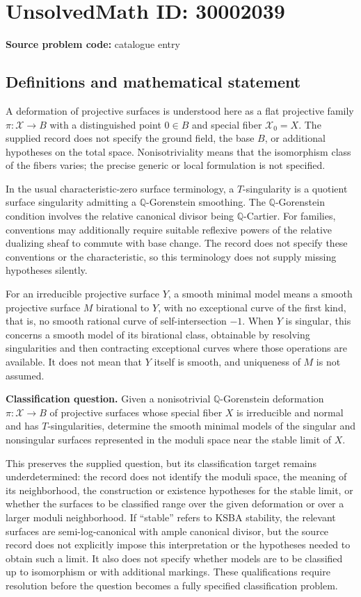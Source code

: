 \documentclass[11pt]{article}
\newcommand{\Q}{\mathbb{Q}}
\begin{document}
\section*{UnsolvedMath ID: 30002039}
\textbf{Source problem code:} catalogue entry
\subsection{Definitions and mathematical statement}
A deformation of projective surfaces is understood here as a flat projective family \(\pi\colon\mathcal X\to B\) with a distinguished point \(0\in B\) and special fiber \(\mathcal X_0=X\). The supplied record does not specify the ground field, the base \(B\), or additional hypotheses on the total space. Nonisotriviality means that the isomorphism class of the fibers varies; the precise generic or local formulation is not specified.

In the usual characteristic-zero surface terminology, a \(T\)-singularity is a quotient surface singularity admitting a \(\Q\)-Gorenstein smoothing. The \(\Q\)-Gorenstein condition involves the relative canonical divisor being \(\Q\)-Cartier. For families, conventions may additionally require suitable reflexive powers of the relative dualizing sheaf to commute with base change. The record does not specify these conventions or the characteristic, so this terminology does not supply missing hypotheses silently.

For an irreducible projective surface \(Y\), a smooth minimal model means a smooth projective surface \(M\) birational to \(Y\), with no exceptional curve of the first kind, that is, no smooth rational curve of self-intersection \(-1\). When \(Y\) is singular, this concerns a smooth model of its birational class, obtainable by resolving singularities and then contracting exceptional curves where those operations are available. It does not mean that \(Y\) itself is smooth, and uniqueness of \(M\) is not assumed.

\textbf{Classification question.} Given a nonisotrivial \(\Q\)-Gorenstein deformation \(\pi\colon\mathcal X\to B\) of projective surfaces whose special fiber \(X\) is irreducible and normal and has \(T\)-singularities, determine the smooth minimal models of the singular and nonsingular surfaces represented in the moduli space near the stable limit of \(X\).

This preserves the supplied question, but its classification target remains underdetermined: the record does not identify the moduli space, the meaning of its neighborhood, the construction or existence hypotheses for the stable limit, or whether the surfaces to be classified range over the given deformation or over a larger moduli neighborhood. If ``stable'' refers to KSBA stability, the relevant surfaces are semi-log-canonical with ample canonical divisor, but the source record does not explicitly impose this interpretation or the hypotheses needed to obtain such a limit. It also does not specify whether models are to be classified up to isomorphism or with additional markings. These qualifications require resolution before the question becomes a fully specified classification problem.
\end{document}
